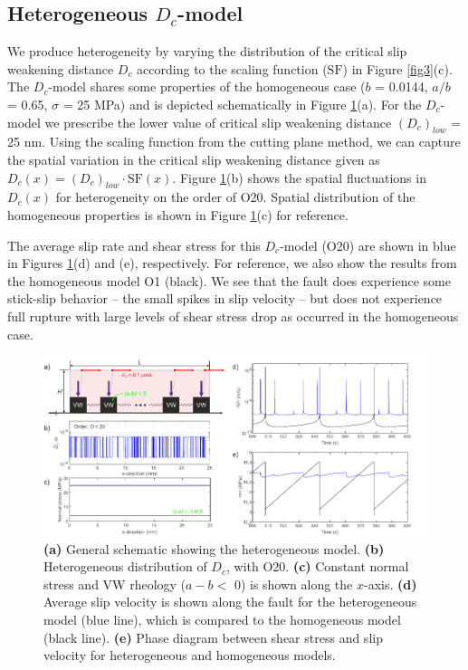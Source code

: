 \documentclass[preprint,1p, 10pt,authoryear]{elsarticle}
\begin{document}
\subsection{Heterogeneous $D_{c}$-model}
We produce heterogeneity by varying the distribution of the critical slip weakening distance $D_{c}$ according to the scaling function ($\mathrm{SF}$) in Figure \ref{fig3}(c). The $D_{c}$-model shares some properties of the homogeneous case ($b$ = 0.0144, $a/b$ = 0.65, $\sigma$ = 25 MPa) and is depicted schematically in Figure \ref{fig6}(a). For the $D_{c}$-model we prescribe the lower value of critical slip weakening distance $(D_{c})_{low}$ = 25 nm. Using the scaling function from the cutting plane method, we can capture the spatial variation in the critical slip weakening distance given as $D_{c}(x) = (D_{c})_{low} \cdot \mathrm{SF}(x)$. Figure \ref{fig6}(b) shows the spatial fluctuations in $D_{c}(x)$ for heterogeneity on the order of O20. Spatial distribution of the homogeneous properties is shown in Figure \ref{fig6}(c) for reference.
 
The average slip rate and shear stress for this $D_{c}$-model (O20) are shown in blue in Figures \ref{fig6}(d) and (e), respectively. For reference, we also show the results from the homogeneous model O1 (black). We see that the fault does experience some stick-slip behavior -- the small spikes in slip velocity -- but does not experience full rupture with large levels of shear stress drop as occurred in the homogeneous case. 

 \begin{figure}
	\centering
	\includegraphics{FIG6_revised.pdf} 
	\caption{\textbf{(a)} General schematic showing the heterogeneous model. \textbf{(b)} Heterogeneous distribution of $D_{c}$, with O20. \textbf{(c)} Constant normal stress and VW rheology ($a-b <$ 0) is shown along the $x$-axis.  \textbf{(d)} Average slip velocity is shown along the fault for the heterogeneous model (blue line), which is compared to the homogeneous model (black line). \textbf{(e)} Phase diagram between shear stress and slip velocity for heterogeneous and homogeneous models.}
	\label{fig6}
\end{figure}
 
\end{document}
